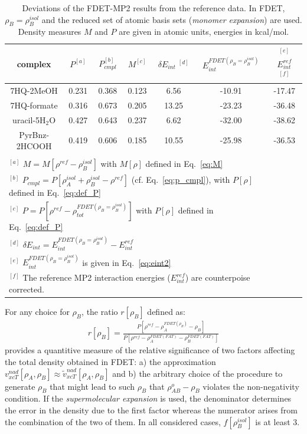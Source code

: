 \documentclass[amsmath,amssymb,preprint,aip,jcp]{revtex4-1}
\begin{document}
\begin{table}
{
\begin{center}
\begin{tabular}{|c|c|c|c|c|c|c|}
\hline
 complex & $P^{[a]}$ & $P_{cmpl}^{[b]}$ & $M^{[c]}$ & $\delta E_{int}\;^{[d]}$ & $E^{FDET(\rho_B=\rho_B^{isol})}_{int}$ & $^{[e]}$ $E_{int}^{ref}$ $^{[f]}$ \\ \hline
7HQ-2MeOH & 0.231 & 0.368 & 0.123 & 6.56 & -10.91 & -17.47 \\ \hline
7HQ-formate & 0.316 & 0.673 & 0.205 & 13.25 & -23.23 & -36.48 \\ \hline
uracil-5H$_2$O & 0.427 & 0.643 & 0.237 & 6.62 & -32.00 & -38.62 \\ \hline
PyrBnz-2HCOOH & 0.419 & 0.606 & 0.185 & 10.55 & -25.98 & -36.53 \\ \hline
\multicolumn{6}{c}{ } \\
\multicolumn{6}{l}{$^{[a]}$ $M=M[\rho^{ref} - \rho^{isol}_{B}]$ with $M[\rho]$ defined in Eq.~\ref{eq:M}}\\
\multicolumn{6}{l}{$^{[b]}$ $P_{cmpl}=P[\rho_A^{isol}+\rho_B^{isol} - \rho^{ref}]$ (cf. Eq.~\ref{eq:p_cmpl}), with $P[\rho]$ defined in Eq.~\ref{eq:def_P}}\\
\multicolumn{6}{l}{$^{[c]}$ $P=P[\rho^{ref} - \rho_{tot}^{FDET(\rho_B=\rho_B^{isol})}]$ with $P[\rho]$ defined in Eq.~\ref{eq:def_P}}\\
\multicolumn{6}{l}{$^{[d]}$ $\delta E_{int}=E^{FDET(\rho_B=\rho_B^{isol})}_{int}-E_{int}^{ref}$} \\
\multicolumn{6}{l}{$^{[e]}$ $E^{FDET(\rho_B=\rho_B^{isol})}_{int}$ is given in Eq.~\ref{eq:eint2}}\\
\multicolumn{6}{l}{$^{[f]}$ The reference MP2 interaction energies ($E_{int}^{ref}$) are counterpoise corrected.}
\end{tabular}
\end{center}
}%
\caption{Deviations of the FDET-MP2 results from the reference data. In FDET, $\rho_B=\rho_B^{isol}$ and the reduced set of atomic basis sets ({\it monomer expansion}) are used. 
Density measures $M$ and $P$ are given in atomic units, energies in kcal/mol.
}
\label{table:ME_isol}
\end{table}

For any choice for $\rho_B$,
the ratio $r[\rho_B]$ defined as:
\begin{eqnarray}
r[\rho_B]=\frac{P[\rho^{ref} - \rho_{A}^{FDET(\rho_{B})}-\rho_{B}]}{P[\rho^{ref} - \rho_{A}^{FDET(FAT)}-\rho_{B}^{FDET(FAT)}]}
\end{eqnarray}
provides a quantitive measure of the relative significance of two factors affecting the total density obtained in FDET:
a) the approximation $v_{xcT}^{nad}[\rho_A,\rho_B]\approx \tilde{v}_{xcT}^{nad}[\rho_A,\rho_B]$ and b) the arbitrary choice of the procedure to generate $\rho_B$ that might lead to such $\rho_B$ that 
$\rho_{AB}^o-\rho_B$ violates the non-negativity condition.
If the {\it supermolecular expansion} is used, the denominator determines the error in the density due to the first factor whereas the numerator arises from the combination of the two of them.
In all considered cases, $f[\rho_B^{isol}]$ is at least 3.
\end{document}
